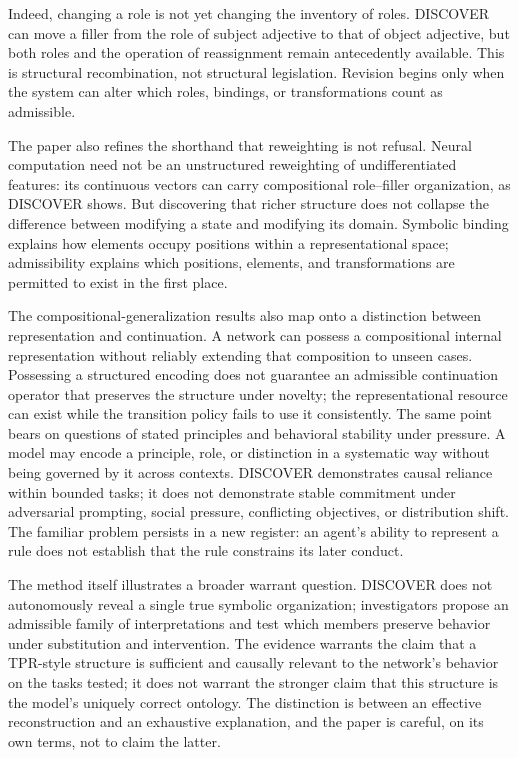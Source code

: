 \documentclass[11pt]{article}
\begin{document}
Indeed, changing a role is not yet changing the inventory of roles. DISCOVER can move a filler from the role of subject adjective to that of object adjective, but both roles and the operation of reassignment remain antecedently available. This is structural recombination, not structural legislation. Revision begins only when the system can alter which roles, bindings, or transformations count as admissible.

The paper also refines the shorthand that reweighting is not refusal. Neural computation need not be an unstructured reweighting of undifferentiated features: its continuous vectors can carry compositional role--filler organization, as DISCOVER shows. But discovering that richer structure does not collapse the difference between modifying a state and modifying its domain. Symbolic binding explains how elements occupy positions within a representational space; admissibility explains which positions, elements, and transformations are permitted to exist in the first place.

The compositional-generalization results also map onto a distinction between representation and continuation. A network can possess a compositional internal representation without reliably extending that composition to unseen cases. Possessing a structured encoding does not guarantee an admissible continuation operator that preserves the structure under novelty; the representational resource can exist while the transition policy fails to use it consistently. The same point bears on questions of stated principles and behavioral stability under pressure. A model may encode a principle, role, or distinction in a systematic way without being governed by it across contexts. DISCOVER demonstrates causal reliance within bounded tasks; it does not demonstrate stable commitment under adversarial prompting, social pressure, conflicting objectives, or distribution shift. The familiar problem persists in a new register: an agent's ability to represent a rule does not establish that the rule constrains its later conduct.

The method itself illustrates a broader warrant question. DISCOVER does not autonomously reveal a single true symbolic organization; investigators propose an admissible family of interpretations and test which members preserve behavior under substitution and intervention. The evidence warrants the claim that a TPR-style structure is sufficient and causally relevant to the network's behavior on the tasks tested; it does not warrant the stronger claim that this structure is the model's uniquely correct ontology. The distinction is between an effective reconstruction and an exhaustive explanation, and the paper is careful, on its own terms, not to claim the latter.
\end{document}
